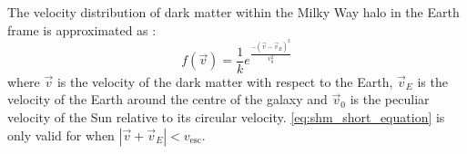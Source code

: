 The velocity distribution of dark matter within the Milky Way halo in the Earth frame is approximated as \cite{direct_dark_matter_of_wimps_concepts_ref, shm_derivation_ref}:
\begin{equation}
    f(\vec{v}) = \frac{1}{k} e^{\frac{- (\vec{v} - \vec{v}_E)^2 }{ v^2_0} }
    \label{eq:shm_short_equation}
\end{equation}
where $\vec{v}$ is the velocity of the dark matter with respect to the Earth, $\vec{v}_E$ is the velocity of the Earth around the centre of the galaxy and $\vec{v}_0$ is the peculiar velocity of the Sun relative to its circular velocity. 
\autoref{eq:shm_short_equation} is only valid for when $|\vec{v} + \vec{v}_E| < v_{\text{esc}}$.


%
